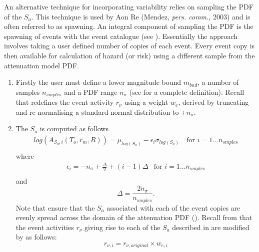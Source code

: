 An alternative technique for incorporating variability relies on
sampling the PDF of the $S_a$. This technique is used by Aon Re
(Mendez, \textit{pers. comm.}, 2003) and is often referred to as
spawning. An integral component of sampling the PDF is the spawning
of events with the event catalogue (see ).
Essentially the approach involves taking a user defined number of
copies of each event. Every event copy is then available for
calculation of hazard (or risk) using a different sample from the
attenuation model PDF.
\begin{enumerate}
\item Firstly the user must define a lower magnitude bound
$m_{bnd}$, a number of samples $n_{smples}$ and a PDF range
$n_\sigma$ (see  for a complete definition).
Recall that  redefines the event activity
$r_\nu$ using a weight $w_e$, derived by truncating and
re-normalising a standard normal distribution to $\pm n_\sigma$.
\item The $S_a$ is computed as follows
\begin{equation}
\label{attn:uncertainty-pdfsample}
\begin{array}{ll}
log(A_{S_a,i}(T_o,r_m,R)) = \mu_{log(S_a)} - \epsilon_i
\sigma_{log(S_a)}\ & \textrm{for $i=1 \ldots
n_{smples}$} \\
\end{array}
\end{equation}
where
\begin{equation}
\label{attn:uncertainty-def-epsilon}
\begin{array}{ll}
\epsilon_i = -n_\sigma + \frac{\Delta}{2} + (i-1)\Delta &
\textrm{for $i=1 \ldots n_{smples}$} \\
\end{array}
\end{equation}
and
\begin{equation}
\Delta = \frac{2n_\sigma}{n_{smples}}.
\end{equation}
Note that
ensure that the $S_a$ associated with each of the event copies are
evenly spread across the domain of the attenuation PDF
(). Recall from 
that the event activities $r_\nu$ giving rise to each of the $S_a$
described in  are modified by
 as follows:
\begin{equation}
r_{\nu,i} = r_{\nu,original} \times w_{e,i}
\end{equation}
\end{enumerate}

